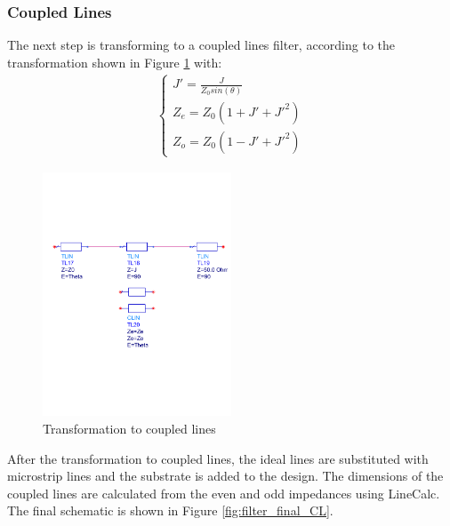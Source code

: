 \documentclass[a4paper]{article}        %
\begin{document}
  \subsubsection{Coupled Lines}

  	The next step is transforming to a coupled lines filter, according to the transformation \cite{pozar} shown in Figure \ref{fig:filter_CL_transform} with:
  	\begin{align}
  		\begin{cases}
  			J' = \frac{J}{Z_0 sin(\theta)} \\
  			Z_e = Z_0 (1 + J' + J'^2) \\
  			Z_o = Z_0 (1 - J' + J'^2)
  		\end{cases}
  	\end{align}

  	\begin{figure}[H]
  		\centering
  		\includegraphics[width=0.5\textwidth]{fig/Filter/2nd_order/CL_transformation.pdf}
  		\caption{Transformation to coupled lines}
  		\label{fig:filter_CL_transform}
  	\end{figure} 

  	After the transformation to coupled lines, the ideal lines are substituted with microstrip lines and the substrate is added to the design. The dimensions of the coupled lines are calculated from the even and odd impedances using LineCalc. The final schematic is shown in Figure \ref{fig:filter_final_CL}. 
\end{document}
